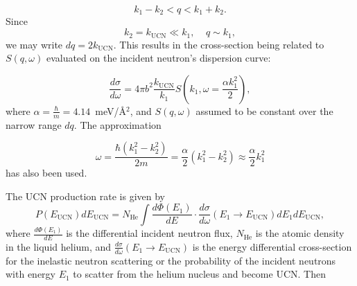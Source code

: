 \begin{equation}
k_1-k_2 < q < k_1+k_2.
\end{equation}
Since
\begin{equation}
k_2=k_{\text{UCN}} \ll k_1, \; \; \; \; q\sim k_1 ,
\end{equation}
we may write $dq=2k_{\text{UCN}}$. This results in the cross-section
being related to $S(q,\omega)$ evaluated on the incident neutron's
dispersion curve:

\begin{equation}
\frac{d\sigma}{d\omega}=4\pi b^2 \frac{k_{\text{UCN}}}{k_1}S \left(
k_1, \omega=\frac{\alpha k_1^2}{2} \right),
\end{equation}
where $\alpha=\frac{\hbar}{m}=4.14$~meV/\AA$^2$, and $S(q,\omega)$
assumed to be constant over the narrow range $dq$. The approximation

\begin{equation}
\omega=\frac{\hbar (k_1^2-k_2^2)}{2m}=\frac{\alpha}{2} (k_1^2 -
k_2^2)\approx \frac{\alpha}{2}k_1^2
\end{equation}
has also been used.

The UCN production rate is given by
\begin{equation}
\label{UCN_production}
P(E_{\text{UCN}}) dE_{\text{UCN}} = N_{\text{He}} \int \frac{d\Phi
  (E_1)}{dE}\cdot \frac{d \sigma}{d \omega}(E_1 \rightarrow
E_{\text{UCN}}) dE_1 dE_{\text{UCN}},
\end{equation}
where $\frac{d\Phi (E_1)}{dE}$ is the differential incident neutron
flux, $N_{\text{He}}$ is the atomic density in the liquid helium, and
$\frac{d \sigma}{d \omega}(E_1 \rightarrow E_{\text{UCN}})$ is the
energy differential cross-section for the inelastic neutron scattering
or the probability of the incident neutrons with energy $E_1$ to
scatter from the helium nucleus and become UCN.  Then

